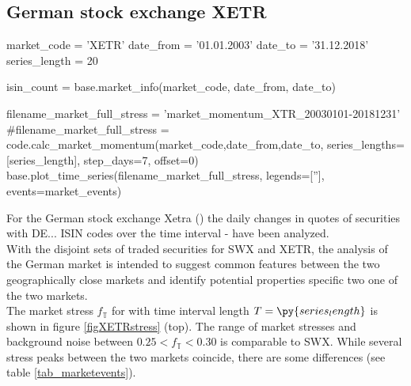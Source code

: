 \documentclass[11pt,twoside,a4paper]{article}
\numberwithin{equation}{section}
\begin{document}
\subsection{German stock exchange XETR}
\begin{pycode}
market_code = 'XETR'
date_from = '01.01.2003'
date_to = '31.12.2018'
series_length = 20

isin_count = base.market_info(market_code, date_from, date_to)

filename_market_full_stress = 'market_momentum_XTR_20030101-20181231'
#filename_market_full_stress = code.calc_market_momentum(market_code,date_from,date_to, series_lengths=[series_length], step_days=7, offset=0)
base.plot_time_series(filename_market_full_stress, legends=[''], events=market_events)
\end{pycode}
For the German stock exchange Xetra () the daily changes in quotes of  securities with DE... ISIN codes over the time interval  -  have been analyzed.\\
With the disjoint sets of traded securities for SWX and XETR, the analysis of the German market is intended to suggest common features between the two geographically close markets and identify potential properties specific two one of the two markets.\\

The market stress $f_\mathbb{T}$ for  with time interval length $T=\py{series_length}$ is shown in figure \ref{figXETRstress} (top). The range of market stresses and background noise between $0.25 < f_\mathbb{T} < 0.30$ is comparable to SWX. While several stress peaks between the two markets coincide, there are some differences (see table \ref{tab_marketevents}).\\
\end{document}
